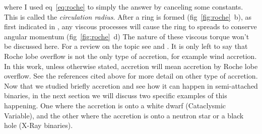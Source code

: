 where I used eq~\ref{eq:roche} to simply the answer by canceling some constants. This is called the \emph{circulation radius}. After a ring is formed (fig~\ref{fig:roche}~b), as first indicated in \cite{lynden-bell_evolution_1974}, any viscous processes will cause the ring to spreads to conserve angular momentum (fig~\ref{fig:roche}~d) The nature of these viscous torque won't be discussed here. For a review on the topic see \cite{frank_accretion_2002} and \cite{verbunt_accretion_1982}. It is only left to say that Roche lobe overflow is not the only type of accretion, for example wind accretion. In this work, unless otherwise stated, accretion will mean accretion by Roche lobe overflow. See the references cited above for more detail on other type of accretion. \\

Now that we studied briefly accretion and see how it can happen in semi-attached binaries, in the next section we will discuss two specific examples of this happening. One where the accretion is onto a white dwarf (Cataclysmic Variable), and the other where the accretion is onto a neutron star or a black hole (X-Ray binaries). 


